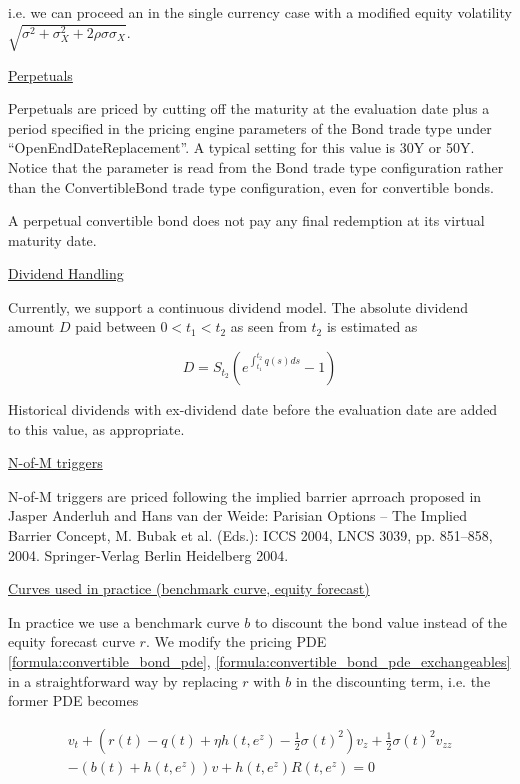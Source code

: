 {i.e. we can proceed an in the single currency case with a modified equity volatility
$\sqrt{\sigma^2 + \sigma_X^2 + 2\rho\sigma\sigma_X}$.

\underline{Perpetuals}

Perpetuals are priced by cutting off the maturity at the evaluation date plus a period specified in the pricing engine
parameters of the Bond trade type under ``OpenEndDateReplacement''. A typical setting for this value is 30Y or
50Y. Notice that the parameter is read from the Bond trade type configuration rather than the ConvertibleBond trade type
configuration, even for convertible bonds.

A perpetual convertible bond does not pay any final redemption at its virtual maturity date.

\underline{Dividend Handling}

Currently, we support a continuous dividend model. The absolute dividend amount $D$ paid between $0<t_1<t_2$ as seen
from $t_2$ is estimated as

\begin{equation}
  D = S_{t_2} \left( e^{\int_{t_1}^{t_2} q(s) ds} - 1 \right)
\end{equation}

Historical dividends with ex-dividend date before the evaluation date are added to this value, as appropriate.

\underline{N-of-M triggers}

N-of-M triggers are priced following the implied barrier aprroach proposed in Jasper Anderluh and Hans van der Weide:
Parisian Options – The Implied Barrier Concept, M. Bubak et al. (Eds.): ICCS 2004, LNCS 3039, pp. 851–858,
2004. Springer-Verlag Berlin Heidelberg 2004.

\underline{Curves used in practice (benchmark curve, equity forecast)}

In practice we use a benchmark curve $b$ to discount the bond value instead of the equity forecast curve $r$. We modify
the pricing PDE \ref{formula:convertible_bond_pde}, \ref{formula:convertible_bond_pde_exchangeables} in a
straightforward way by replacing $r$ with $b$ in the discounting term, i.e. the former PDE becomes

\begin{eqnarray}\label{formula:convertible_bond_pde_with_benchmark_curve}
v_t + \left( r(t)-q(t)+\eta h(t,e^z)-\frac{1}{2}\sigma(t)^2 \right) v_z + \frac{1}{2}\sigma(t)^2 v_{zz}  \\
- (b(t)+h(t,e^z)) v + h(t,e^z) R(t,e^z) = 0
\end{eqnarray}

}
